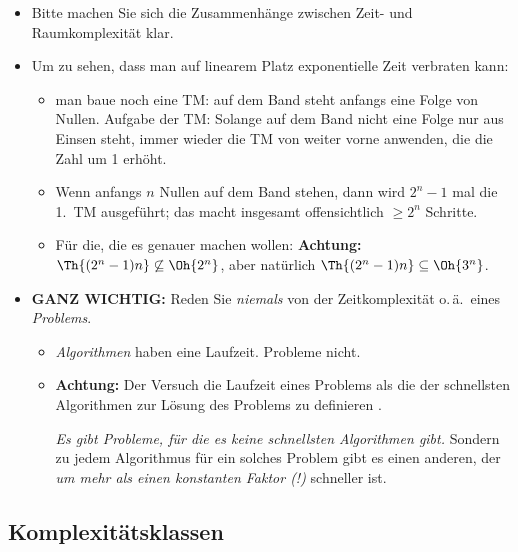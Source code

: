 \begin{tutorium}
  \begin{itemize}
  \item Bitte machen Sie sich die Zusammenhänge zwischen Zeit- und
    Raumkomplexität klar.
  \item Um zu sehen, dass man auf linearem Platz exponentielle Zeit
    verbraten kann:
    \begin{itemize}
    \item man baue noch eine TM: auf dem Band steht anfangs eine Folge
      von Nullen. Aufgabe der TM: Solange auf dem Band nicht eine
      Folge nur aus Einsen steht, immer wieder die TM von weiter vorne
      anwenden, die die Zahl um 1 erhöht.
    \item Wenn anfangs $n$ Nullen auf dem Band stehen, dann wird
      $2^n-1$ mal die 1.~TM ausgeführt; das macht insgesamt
      offensichtlich $\geq 2^n$ Schritte.
    \item Für die, die es genauer machen wollen: \textbf{Achtung:}
      $\Th{(2^n-1)n} \not\subseteq \Oh{2^n}$, aber natürlich \zB
      $\Th{(2^n-1)n} \subseteq \Oh{3^n}$.
    \end{itemize}
  \end{itemize}
\end{tutorium}

\begin{tutorium}
  \begin{itemize}
  \item \textbf{GANZ WICHTIG:} Reden Sie \emph{niemals} von der
    Zeitkomplexität o.\,ä.~eines \emph{Problems}.
    \begin{itemize}
    \item \emph{Algorithmen} haben eine Laufzeit. Probleme nicht.
    \item \textbf{Achtung:} Der Versuch die Laufzeit eines Problems
      als die der schnellsten Algorithmen zur Lösung des Problems zu
      definieren .

      \emph{Es gibt Probleme, für die es keine schnellsten
        Algorithmen gibt.} Sondern zu jedem Algorithmus für ein
      solches Problem gibt es einen anderen, der \emph{um mehr als
        einen konstanten Faktor (!)} schneller ist.
    \end{itemize}
  \end{itemize}
\end{tutorium}


\Tut\subsection{Komplexit\"atsklassen}
\label{subsec:kompl-klassen}

